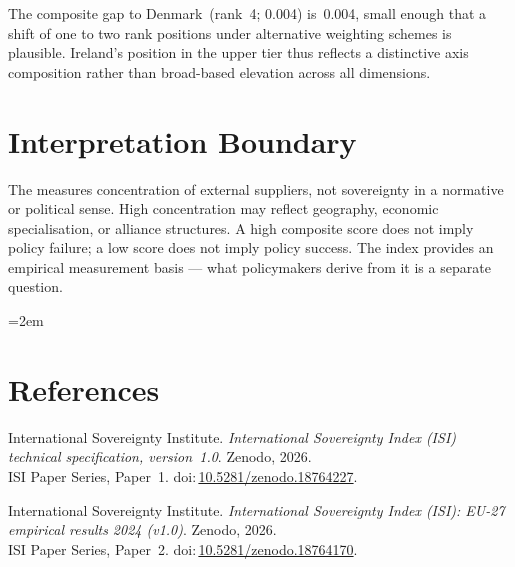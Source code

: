 \documentclass[12pt,a4paper]{article}
\begin{document}
The composite gap to Denmark~(rank~4; 0.004) is~0.004, small enough that a shift of one to two rank positions under alternative weighting schemes is plausible.  Ireland's position in the upper tier thus reflects a distinctive axis composition rather than broad-based elevation across all dimensions.


\section{Interpretation Boundary}
\label{sec:interpretation}

The \ISI measures concentration of external suppliers, not sovereignty in a normative or political sense.  High concentration may reflect geography, economic specialisation, or alliance structures.  A high composite score does not imply policy failure; a low score does not imply policy success.  The index provides an empirical measurement basis --- what policymakers derive from it is a separate question.


\clearpage
\vspace*{1.5cm}

\begingroup\emergencystretch=2em
\section*{References}

\begin{enumerate}[label={[\arabic*]},leftmargin=2em,itemsep=6pt]
\item International Sovereignty Institute.
  \textit{International Sovereignty Index (ISI) technical specification, version~1.0}.
  Zenodo, 2026.\\ISI Paper Series, Paper~1.
  doi:\,\href{https://doi.org/10.5281/zenodo.18764227}{10.5281/zenodo.18764227}.

\item International Sovereignty Institute.
  \textit{International Sovereignty Index (ISI): EU-27 empirical results 2024 (v1.0)}.
  Zenodo, 2026.\\ISI Paper Series, Paper~2.
  doi:\,\href{https://doi.org/10.5281/zenodo.18764170}{10.5281/zenodo.18764170}.
\end{enumerate}
\endgroup
\end{document}
